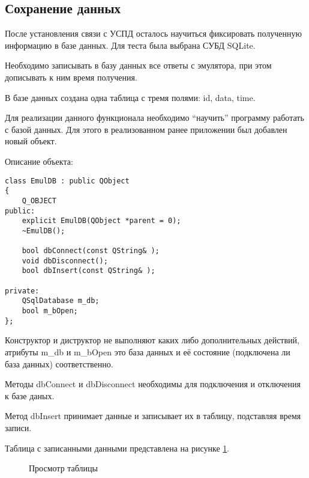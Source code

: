 \subsection{Сохранение данных}

После установления связи с УСПД осталось научиться фиксировать полученную информацию в базе данных. Для теста была выбрана СУБД SQLite. 

Необходимо записывать в базу данных все ответы с эмулятора, при этом дописывать к ним время получения.

В базе данных создана одна таблица с тремя полями: id, data, time.

Для реализации данного функционала необходимо ``научить'' программу работать с базой данных. Для этого в реализованном ранее приложении был добавлен новый объект. 

Описание объекта:

\begin{lstlisting}
class EmulDB : public QObject
{
    Q_OBJECT
public:
    explicit EmulDB(QObject *parent = 0);
    ~EmulDB();

    bool dbConnect(const QString& );
    void dbDisconnect();
    bool dbInsert(const QString& );

private:
    QSqlDatabase m_db;
    bool m_bOpen;
};
\end{lstlisting}
Конструктор и диструктор не выполняют каких либо дополнительных действий, атрибуты m\_db и m\_bOpen это база данных и её состояние (подключена ли база данных) соответственно.

Методы dbConnect и dbDisconnect необходимы для подключения и отключения к базе даных. 

Метод dbInsert принимает данные и записывает их в таблицу, подставляя время записи.

Таблица с записанными данными представлена на рисунке \ref{dBase:dBase}.

\begin{figure}[h!]
 \caption{Просмотр таблицы}
 \label{dBase:dBase}
\end{figure}
